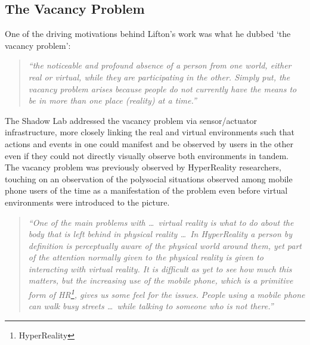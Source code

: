 
\newpage

\subsection{The Vacancy Problem}

One of the driving motivations behind Lifton's work was what he dubbed `the vacancy problem':

\begin{quote}
\textit{``the noticeable and profound absence of a person from one world, either real or virtual, while they are participating in the other. Simply put, the vacancy problem arises because people do not currently have the means to be in more than one place (reality) at a time.''}~\cite{Lifton2007a}
\end{quote}

The Shadow Lab addressed the vacancy problem via sensor/actuator infrastructure, more closely linking the real and virtual environments such that actions and events in one could manifest and be observed by users in the other even if they could not directly visually observe both environments in tandem. The vacancy problem was previously observed by HyperReality researchers, touching on an observation of the polysocial situations observed among mobile phone users of the time as a manifestation of the problem even before virtual environments were introduced to the picture. %

\begin{quote}
	\textit{``One of the main problems with \ldots\ virtual reality is what to do about the body that is left behind in physical reality \ldots\ In HyperReality a person by definition is perceptually aware of the physical world around them, yet part of the attention normally given to the physical reality is given to interacting with virtual reality. It is difficult as yet to see how much this matters, but the increasing use of the mobile phone, which is a primitive form of HR\footnote{HyperReality}, gives us some feel for the issues. People using a mobile phone can walk busy streets \ldots\ while talking to someone who is not there.''}~\cite{Terashima2001}
\end{quote}


